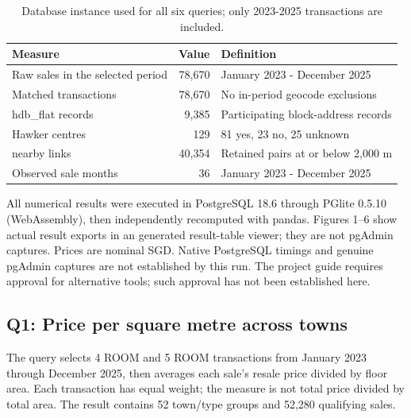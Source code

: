 
\begin{table}[H]\centering\small
\begin{tabular}{lrl}
\toprule
Measure & Value & Definition \\
\midrule
Raw sales in the selected period & 78,670 & January 2023 - December 2025 \\
Matched transactions & 78,670 & No in-period geocode exclusions \\
hdb\_flat records & 9,385 & Participating block-address records \\
Hawker centres & 129 & 81 yes, 23 no, 25 unknown \\
nearby links & 40,354 & Retained pairs at or below 2,000 m \\
Observed sale months & 36 & January 2023 - December 2025 \\
\bottomrule
\end{tabular}
\caption{Database instance used for all six queries; only 2023-2025 transactions are included.}
\end{table}
\begin{samepage}All numerical results were executed in PostgreSQL 18.6 through PGlite 0.5.10 (WebAssembly), then independently recomputed with pandas. Figures 1--6 show actual result exports in an generated result-table viewer; they are not pgAdmin captures. Prices are nominal SGD. Native PostgreSQL timings and genuine pgAdmin captures are not established by this run. The project guide requires approval for alternative tools; such approval has not been established here.\par\end{samepage}

\subsection{Q1: Price per square metre across towns}
\begin{samepage}The query selects 4 ROOM and 5 ROOM transactions from January 2023 through December 2025, then averages each sale's resale price divided by floor area. Each transaction has equal weight; the measure is not total price divided by total area. The result contains 52 town/type groups and 52,280 qualifying sales.\par\end{samepage}

